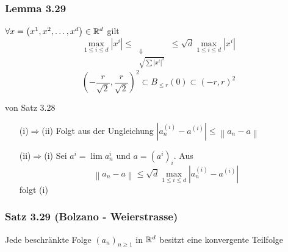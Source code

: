 \subsubsection*{Lemma 3.29}
$\forall x=\left( x^1,x^2,\dots,x^d\right) \in\mathbb{R}^d$ gilt 
\[\mathop {\max }\limits_{1 \le i \le d} \left| {{x^i}} \right| \le \mathop {\left\| x \right\|}\limits_{\begin{array}{*{20}{c}}
 \Downarrow \\
{\sqrt {\sum {{{\left| {{x^i}} \right|}^2}} } }
\end{array}}  \le \sqrt d \mathop {\max }\limits_{1 \le i \le d} \left| {{x^i}} \right|\]
\[{\left( { - \frac{r}{{\sqrt 2 }},\frac{r}{{\sqrt 2 }}} \right)^2} \subset {B_{ \le r}}\left( 0 \right) \subset {\left( { - r,r} \right)^2}\]

\begin{beweis}{von Satz 3.28}
\begin{enumerate}[align=left]
\item[(i)$\Rightarrow$(ii)]Folgt aus der Ungleichung $\left| {a_n^{(i)} - {a^{(i)}}} \right| \le \left\| {{a_n} - a} \right\|$
\item[(ii)$\Rightarrow$(i)]Sei $a^i=\lim a_n^i$ und $a=\left( a^i\right)_i$. Aus \[\left\| {{a_n} - a} \right\| \le \sqrt d \mathop {\max }\limits_{1 \le i \le d} \left| {a_n^{(i)} - {a^{(i)}}} \right|\] folgt (i)
\end{enumerate}
\end{beweis}

\subsubsection*{Satz 3.29 (Bolzano - Weierstrasse)}
Jede beschränkte Folge $\left( a_n\right)_{n\geq 1}$ in $\mathbb{R}^d$ besitzt eine konvergente Teilfolge
